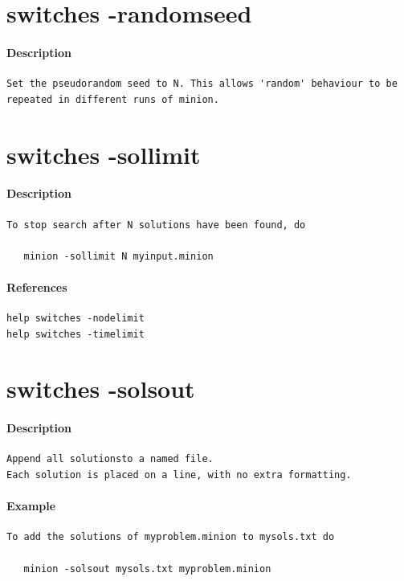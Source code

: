 \documentclass[oneside]{book}
\begin{document}
\section{switches -randomseed}
\paragraph{Description}
{\footnotesize
\begin{verbatim}
Set the pseudorandom seed to N. This allows 'random' behaviour to be
repeated in different runs of minion.
\end{verbatim}
}
\section{switches -sollimit}
\paragraph{Description}
{\footnotesize
\begin{verbatim}
To stop search after N solutions have been found, do

   minion -sollimit N myinput.minion
\end{verbatim}
}
\paragraph{References}
{\footnotesize
\begin{verbatim}
help switches -nodelimit
help switches -timelimit
\end{verbatim}
}
\section{switches -solsout}
\paragraph{Description}
{\footnotesize
\begin{verbatim}
Append all solutionsto a named file.
Each solution is placed on a line, with no extra formatting.
\end{verbatim}
}
\paragraph{Example}
{\footnotesize
\begin{verbatim}
To add the solutions of myproblem.minion to mysols.txt do

   minion -solsout mysols.txt myproblem.minion
\end{verbatim}
}
\end{document}
